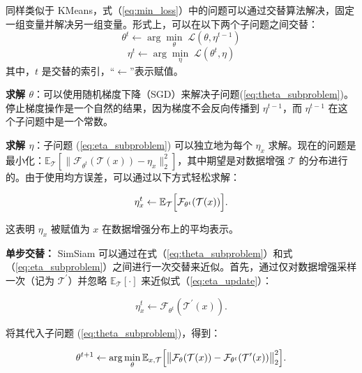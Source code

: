 \documentclass[master]{thesis-uestc}
\begin{document}
同样类似于 KMeans，式（\ref{eq:min_loss}）中的问题可以通过交替算法解决，固定一组变量并解决另一组变量。形式上，可以在以下两个子问题之间交替：
\begin{equation}
\label{eq:theta_subproblem}
\theta^{t} \leftarrow \arg\min_{\theta}\;\mathcal{L}(\theta,\eta^{t-1})
\end{equation}
\begin{equation}
\label{eq:eta_subproblem}
\eta^{t} \leftarrow \arg\min_{\eta}\;\mathcal{L}(\theta^{t},\eta)
\end{equation}
其中，$t$ 是交替的索引，“$\leftarrow$”表示赋值。

\textbf{求解 $\theta$}：可以使用随机梯度下降（SGD）来解决子问题(\ref{eq:theta_subproblem})。停止梯度操作是一个自然的结果，因为梯度不会反向传播到 $\eta^{t-1}$，而 $\eta^{t-1}$ 在这个子问题中是一个常数。

\textbf{求解 $\eta$}：子问题 (\ref{eq:eta_subproblem}) 可以独立地为每个 $\eta_{x}$ 求解。现在的问题是最小化：$\mathbb{E}_{\mathcal{T}}\left[\|\mathcal{F}_{\theta^{t}}(\mathcal{T}(x))-\eta_{x} \|_{2}^{2}\right]$，其中期望是对数据增强 $\mathcal{T}$ 的分布进行的。由于使用均方误差，可以通过以下方式轻松求解：

\begin{equation}
\label{eq:eta_update}
\eta_{x}^{t}\leftarrow\mathbb{E}_{\mathcal{T}}\Big{[}\mathcal{F}_{\theta^{t}}( \mathcal{T}(x))\Big{]}.
\end{equation}

这表明 $\eta_{x}$ 被赋值为 $x$ 在数据增强分布上的平均表示。

\textbf{单步交替：} SimSiam 可以通过在式（\ref{eq:theta_subproblem}）和式（\ref{eq:eta_subproblem}）之间进行一次交替来近似。首先，通过仅对数据增强采样一次（记为 $\mathcal{T}^{\prime}$）并忽略 $\mathbb{E}_{\mathcal{T}}[\cdot]$ 来近似式（\ref{eq:eta_update}）：

\begin{equation}
\label{eq:eta_approx}
\eta_{x}^{t}\leftarrow\mathcal{F}_{\theta^{t}}(\mathcal{T}^{\prime}(x)).
\end{equation}

将其代入子问题 (\ref{eq:theta_subproblem})，得到：

\begin{equation}
\label{eq:theta_update}
\theta^{t+1}\leftarrow\arg\min_{\theta}\mathbb{E}_{x,\mathcal{T}}\Big{[}\big{\| }\mathcal{F}_{\theta}(\mathcal{T}(x))-\mathcal{F}_{\theta^{t}}(\mathcal{T}^{ \prime}(x))\big{\|}_{2}^{2}\Big{]}.
\end{equation}
\end{document}
